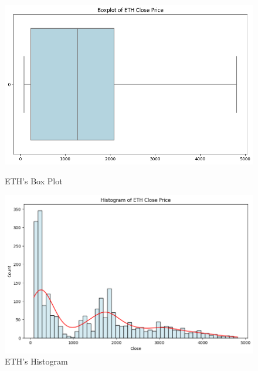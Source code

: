\documentclass{ieeeojies}
\begin{document}
\begin{figure}[H]
    \centering
    \begin{minipage}{0.23\textwidth}
        \centering
        \includegraphics[width=\linewidth]{graph/eth_boxplot.png}
        \caption{ETH's Box Plot}
        \label{fig:5}
    \end{minipage}
    \hfill
    \begin{minipage}{0.23\textwidth}
        \centering
        \includegraphics[width=\linewidth]{graph/eth_his.png}
        \caption{ETH's Histogram}
        \label{fig:6}
    \end{minipage}

\end{figure}
\end{document}
